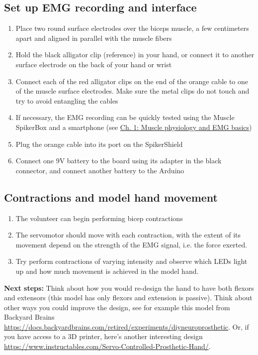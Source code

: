 \documentclass{article}
\begin{document}
\subsection{Set up EMG recording and interface}

\begin{enumerate}
\item Place two round surface electrodes over the biceps muscle, a few centimeters apart and aligned in parallel with the muscle fibers
\item Hold the black alligator clip (reference) in your hand, or connect it to another surface electrode on the back of your hand or wrist
\item Connect each of the red alligator clips on the end of the orange cable to one of the muscle surface electrodes. Make sure the metal clips do not touch and try to avoid entangling the cables
\item If necessary, the EMG recording can be quickly tested using the Muscle SpikerBox and a smartphone (see \href{https://curvenote.com/oxa:EPpXta8zJdzN048lz8AR/hZTnTYzQR5EQmCKX51Wj}{Ch. 1: Muscle physiology and EMG basics})
\item Plug the orange cable into its port on the SpikerShield
\item Connect one 9V battery to the board using its adapter in the black connector, and connect another battery to the Arduino
\end{enumerate}

\subsection{Contractions and model hand movement}

\begin{enumerate}
\item The volunteer can begin performing bicep contractions
\item The servomotor should move with each contraction, with the extent of its movement depend on the strength of the EMG signal, i.e. the force exerted.
\item Try perform contractions of varying intensity and observe which LEDs light up and how much movement is achieved in the model hand.
\end{enumerate}

\textbf{Next steps:} Think about how you would re-design the hand to have both flexors and extensors (this model has only flexors and extension is passive). Think about other ways you could improve the design, see for example this model from Backyard Brains \href{https://docs.backyardbrains.com/retired/experiments/diyneuroprosthetic}{https://docs.backyardbrains.com/retired/experiments/diyneuroprosthetic}. Or, if you have access to a 3D printer, here's another interesting design \href{https://www.instructables.com/Servo-Controlled-Prosthetic-Hand/}{https://www.instructables.com/Servo-Controlled-Prosthetic-Hand/}.

\clearpage

\end{document}
